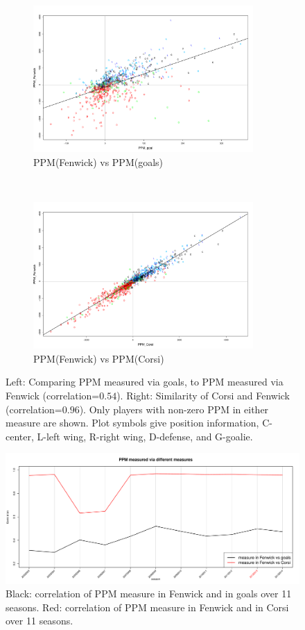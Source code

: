 \begin{figure}[t!]
    \centering
    \begin{subfigure}[t]{0.5\textwidth}
        \centering
        \includegraphics[height=2.2in]{figures/fenwickvsgoals_overall.pdf}
        \caption{PPM(Fenwick) vs PPM(goals)}
    \end{subfigure}%
    ~ 
    \begin{subfigure}[t]{0.5\textwidth}
        \centering
        \includegraphics[height=2.2in]{figures/fenwickvscorsi_overall.pdf}
        \caption{PPM(Fenwick) vs PPM(Corsi)}
    \end{subfigure}
    \caption{Left: Comparing PPM measured via goals, to PPM measured via Fenwick (correlation=$0.54$). Right: Similarity of Corsi and Fenwick (correlation=$0.96$). Only players with non-zero PPM in either measure are shown. Plot symbols give position information, C-center, L-left wing, R-right wing, D-defense, and G-goalie.}
    \label{fig:ppm_diffmeasure}
\end{figure}

\begin{figure}[htb!]
    \centering
    \includegraphics[width=\textwidth]{figures/ppm-corr-diffmeasure-season.pdf}
    \caption{Black: correlation of PPM measure in Fenwick and in goals over 11 seasons.  Red: correlation of PPM measure in Fenwick and in Corsi over 11 seasons.}\label{fig:ppm-corr-diffmeasure-season}
\end{figure}

